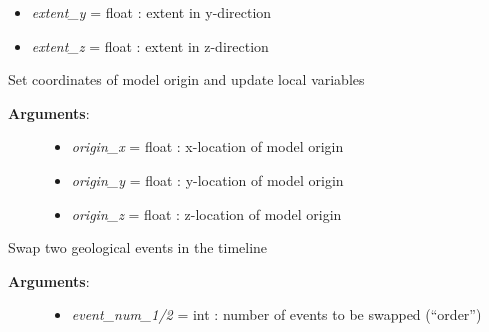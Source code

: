 \documentclass[a4paper,10pt,english]{sphinxmanual}
\begin{document}
\begin{fulllineitems}
\begin{fulllineitems}
\begin{description}
\begin{itemize}
\item {} 
\emph{extent\_y} = float : extent in y-direction

\item {} 
\emph{extent\_z} = float : extent in z-direction

\end{itemize}

\end{description}

\end{fulllineitems}


\begin{fulllineitems}
\label{pynoddy:pynoddy.history.NoddyHistory.set_origin}
Set coordinates of model origin and update local variables
\begin{description}
\item[{\textbf{Arguments}:}] \leavevmode\begin{itemize}
\item {} 
\emph{origin\_x} = float : x-location of model origin

\item {} 
\emph{origin\_y} = float : y-location of model origin

\item {} 
\emph{origin\_z} = float : z-location of model origin

\end{itemize}

\end{description}

\end{fulllineitems}


\begin{fulllineitems}
\label{pynoddy:pynoddy.history.NoddyHistory.swap_events}
Swap two geological events in the timeline
\begin{description}
\item[{\textbf{Arguments}:}] \leavevmode\begin{itemize}
\item {} 
\emph{event\_num\_1/2} = int : number of events to be swapped (``order'')


\end{itemize}
\end{description}
\end{fulllineitems}
\end{fulllineitems}
\end{document}
